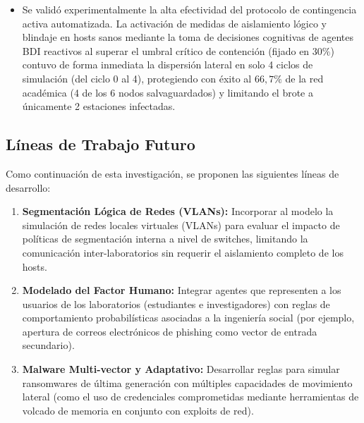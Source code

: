 \begin{itemize}
    \item Se validó experimentalmente la alta efectividad del protocolo de contingencia activa automatizada. La activación de medidas de aislamiento lógico y blindaje en hosts sanos mediante la toma de decisiones cognitivas de agentes BDI reactivos al superar el umbral crítico de contención (fijado en $30\%$) contuvo de forma inmediata la dispersión lateral en solo 4 ciclos de simulación (del ciclo 0 al 4), protegiendo con éxito al $66,7\%$ de la red académica (4 de los 6 nodos salvaguardados) y limitando el brote a únicamente 2 estaciones infectadas.
\end{itemize}

\subsection{Líneas de Trabajo Futuro}
Como continuación de esta investigación, se proponen las siguientes líneas de desarrollo:
\begin{enumerate}
    \item \textbf{Segmentación Lógica de Redes (VLANs):} Incorporar al modelo la simulación de redes locales virtuales (VLANs) para evaluar el impacto de políticas de segmentación interna a nivel de switches, limitando la comunicación inter-laboratorios sin requerir el aislamiento completo de los hosts.
    \item \textbf{Modelado del Factor Humano:} Integrar agentes que representen a los usuarios de los laboratorios (estudiantes e investigadores) con reglas de comportamiento probabilísticas asociadas a la ingeniería social (por ejemplo, apertura de correos electrónicos de phishing como vector de entrada secundario).
    \item \textbf{Malware Multi-vector y Adaptativo:} Desarrollar reglas para simular ransomwares de última generación con múltiples capacidades de movimiento lateral (como el uso de credenciales comprometidas mediante herramientas de volcado de memoria en conjunto con exploits de red).
\end{enumerate}
